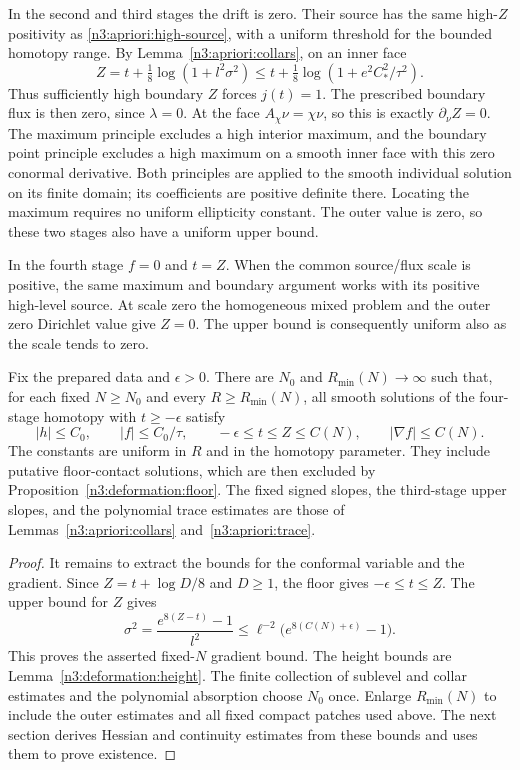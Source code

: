 In the second and third stages the drift is zero.  Their source has
the same high-$Z$ positivity as \eqref{n3:apriori:high-source}, with a
uniform threshold for the bounded homotopy range.  By
Lemma~\ref{n3:apriori:collars}, on an inner face
\begin{equation}
 Z=t+\tfrac18\log(1+l^2\sigma^2)
       \le t+\tfrac18\log(1+e^2C_*^2/\tau^2).
 \label{n3:apriori:high-boundary-t}
\end{equation}
Thus sufficiently high boundary $Z$ forces $j(t)=1$.
The prescribed boundary flux is then zero, since $\lambda=0$.
At the face $A_\chi\nu=\chi\nu$, so this is exactly
$\partial_\nu Z=0$.  The maximum principle excludes a high interior
maximum, and the boundary point principle excludes a high maximum
on a smooth inner face with this zero conormal derivative.  Both
principles are applied to the smooth individual solution on its
finite domain; its coefficients are positive definite there.
Locating the maximum requires no uniform ellipticity constant.
The outer value is zero, so these two stages also have a uniform upper
bound.

In the fourth stage $f=0$ and $t=Z$.  When the common source/flux
scale is positive, the same maximum and boundary argument works
with its positive high-level source.  At scale zero the homogeneous
mixed problem and the outer zero Dirichlet value give $Z=0$.
The upper bound is consequently uniform also as the scale tends
to zero.

\begin{proposition}
\label{n3:apriori:bounds}
Fix the prepared data and $\epsilon>0$.  There are $N_0$ and
$R_{\min}(N)\to\infty$ such that, for each fixed $N\ge N_0$ and
every $R\ge R_{\min}(N)$, all smooth solutions of the four-stage
homotopy with $t\ge-\epsilon$ satisfy
\begin{equation}
 |h|\le C_0,\qquad |f|\le C_0/\tau,\qquad
 -\epsilon\le t\le Z\le C(N),\qquad
 |\nabla f|\le C(N).
 \label{n3:apriori:bounded-variables}
\end{equation}
The constants are uniform in $R$ and in the homotopy parameter.
They include putative floor-contact solutions, which are then
excluded by Proposition~\ref{n3:deformation:floor}.
The fixed signed slopes, the third-stage upper slopes, and the
polynomial trace estimates are those of
Lemmas~\ref{n3:apriori:collars} and~\ref{n3:apriori:trace}.
\end{proposition}

\begin{proof}
It remains to extract the bounds for the conformal variable and the
gradient. Since $Z=t+\log D/8$ and $D\ge1$, the floor gives
$-\epsilon\le t\le Z$.  The upper bound for $Z$ gives
\[
 \sigma^2=\frac{e^{8(Z-t)}-1}{l^2}
       \le\ell^{-2}\bigl(e^{8(C(N)+\epsilon)}-1\bigr).
\]
This proves the asserted fixed-$N$ gradient bound.  The height bounds
are Lemma~\ref{n3:deformation:height}.  The finite collection of
sublevel and collar estimates and the polynomial absorption choose
$N_0$ once.  Enlarge $R_{\min}(N)$ to include the outer estimates and
all fixed compact patches used above. The next section derives Hessian
and continuity estimates from these bounds and uses them to prove
existence.
\end{proof}
